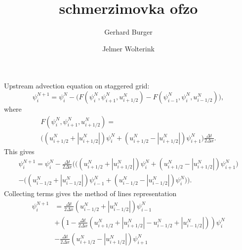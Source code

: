 \documentclass[12pt, a4paper]{article}
\author{Gerhard Burger \and Jelmer Wolterink}
\title{schmerzimovka ofzo}
\newcommand{\abs}[1]{\left\lvert#1\right\rvert}
\begin{document}
\maketitle

Upstream advection equation on staggered grid:
\begin{equation}
 \psi_i^{N+1} = \psi_i^N - \Big( F \left( \psi_i^N,\psi_{i+1}^N,u_{i+1/2}^N\right) 
-F \left( \psi_{i-1}^N,\psi_{i}^N,u_{i-1/2}^N\right) \Big),
\end{equation}
where
\begin{multline}
F \left( \psi_i^N,\psi_{i+1}^N,u_{i+1/2}^N\right) =\\ 
\Big( \left( u_{i+1/2}^N + \abs{u_{i+1/2}^N} \right) \psi_i^N 
+ \left( u_{i+1/2}^N - \abs{u_{i+1/2}^N} \right) \psi_{i+1}^N \Big)
\frac{\Delta t}{2 \Delta x}.
\end{multline}
This gives
\begin{multline}
\psi_i^{N+1} = \psi_i^N - \frac{\Delta t}{2 \Delta x} \bigg( \Big( \left( u_{i+1/2}^N + \abs{u_{i+1/2}^N} \right) \psi_i^N 
+ \left( u_{i+1/2}^N - \abs{u_{i+1/2}^N} \right) \psi_{i+1}^N \Big)
\\
- \Big( \left( u_{i-1/2}^N + \abs{u_{i-1/2}^N} \right) \psi_{i-1}^N 
+ \left( u_{i-1/2}^N - \abs{u_{i-1/2}^N} \right) \psi_{i}^N \Big) \bigg).
\end{multline}
Collecting terms gives the method of lines representation
\begin{equation}
\begin{split}
\psi_i^{N+1} &= 
\frac{\Delta t}{2 \Delta x} \left( u_{i-1/2}^N + \abs{u_{i-1/2}^N} \right) \psi_{i-1}^N\\
&+ \left(1 - \frac{\Delta t}{2 \Delta x} \left( u_{i+1/2}^N + \abs{u_{i+1/2}^N} - u_{i-1/2}^N + \abs{u_{i-1/2}^N} \right) \right) \psi_i^N\\ 
&-\frac{\Delta t}{2 \Delta x} \left( u_{i+1/2}^N - \abs{u_{i+1/2}^N} \right) \psi_{i+1}^N\\
\end{split}
\end{equation}
\end{document}
